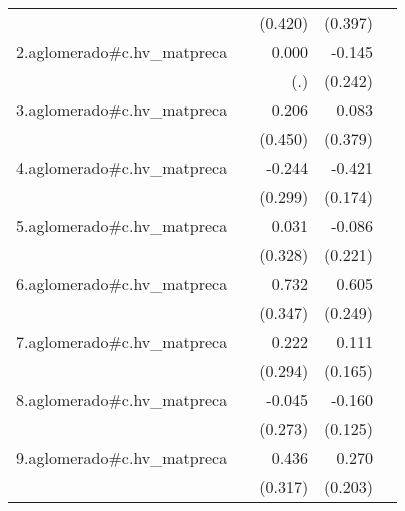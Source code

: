 {\begin{longtable}{l*{4}{D{.}{.}{-1}}}
            &                     &     (0.420)         &     (0.397)         &                     \\
\addlinespace
2.aglomerado#c.hv\_matpreca&                     &       0.000         &      -0.145         &                     \\
            &                     &         (.)         &     (0.242)         &                     \\
\addlinespace
3.aglomerado#c.hv\_matpreca&                     &       0.206         &       0.083         &                     \\
            &                     &     (0.450)         &     (0.379)         &                     \\
\addlinespace
4.aglomerado#c.hv\_matpreca&                     &      -0.244         &      -0.421\sym{*}  &                     \\
            &                     &     (0.299)         &     (0.174)         &                     \\
\addlinespace
5.aglomerado#c.hv\_matpreca&                     &       0.031         &      -0.086         &                     \\
            &                     &     (0.328)         &     (0.221)         &                     \\
\addlinespace
6.aglomerado#c.hv\_matpreca&                     &       0.732\sym{*}  &       0.605\sym{*}  &                     \\
            &                     &     (0.347)         &     (0.249)         &                     \\
\addlinespace
7.aglomerado#c.hv\_matpreca&                     &       0.222         &       0.111         &                     \\
            &                     &     (0.294)         &     (0.165)         &                     \\
\addlinespace
8.aglomerado#c.hv\_matpreca&                     &      -0.045         &      -0.160         &                     \\
            &                     &     (0.273)         &     (0.125)         &                     \\
\addlinespace
9.aglomerado#c.hv\_matpreca&                     &       0.436         &       0.270         &                     \\
            &                     &     (0.317)         &     (0.203)         &                     \\

\end{longtable}}
